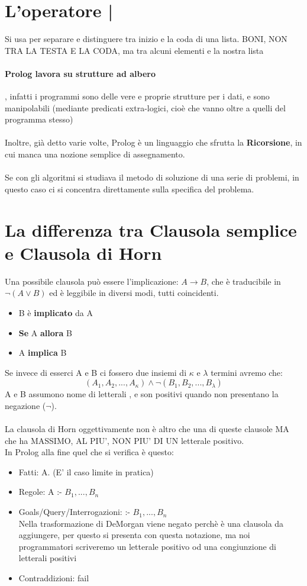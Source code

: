 \documentclass[12pt, a4paper, openany, oneside]{book}
\begin{document}
\section{L'operatore | }
Si usa per separare e distinguere tra inizio e la coda di una lista. BONI, NON 
TRA LA TESTA E LA CODA, ma tra alcuni elementi e la nostra lista
\paragraph{Prolog lavora su strutture ad albero }, infatti i programmi sono delle
vere e proprie strutture per i dati, e sono manipolabili (mediante predicati
extra-logici, cioè che vanno oltre a quelli del programma stesso)
\\ \\
Inoltre, già detto varie volte, Prolog è un linguaggio che sfrutta la 
\textbf{Ricorsione}, in cui manca una nozione semplice di assegnamento.
\\ \\
Se con gli algoritmi si studiava il metodo di soluzione di una serie di problemi,
in questo caso ci si concentra direttamente sulla specifica del problema.
\section{La differenza tra Clausola semplice e Clausola di \color{red} Horn
\color{black}}
Una possibile clausola può essere l'implicazione: $A \to B$, che è traducibile
in $\neg(A \vee B)$ ed è leggibile in diversi modi, tutti coincidenti.
\begin{itemize}
	\item B è \textbf{implicato} da A
	\item \textbf{Se} A \textbf{allora} B
	\item A \textbf{implica} B
\end{itemize}
Se invece di esserci A e B ci fossero due insiemi di $\kappa$ e $\lambda$ 
termini avremo che:
\[
(A_{1}, A_{2}, ... ,A_{\kappa}) \wedge \neg(B_{1}, B_{2}, ... ,B_{\lambda})
\]
A e B assumono nome di \color{red} letterali \color{black}, e son positivi 
quando non presentano la negazione ($\neg$).
\\ \\
La clausola di Horn oggettivamente non è altro che una di queste clausole MA 
che ha MASSIMO, AL PIU', NON PIU' DI UN letterale positivo.
\\ 
In Prolog alla fine quel che si verifica è questo:
\begin{itemize}
	\item \color{red} Fatti:  \color{black} A. (E' il caso limite in pratica)
	\item \color{red} Regole: \color{black} A :- $B_{1}, ..., B_{n}$
	\item \color{red} Goals/Query/Interrogazioni:  \color{black} :- $B_{1}, ..., B_{n}$ \\
	Nella trasformazione di DeMorgan viene negato perchè è una clausola da 
	aggiungere, per questo si presenta con questa notazione, ma noi
	programmatori scriveremo un letterale positivo od una congiunzione di 
	letterali positivi
	\item \color{red} Contraddizioni: \color{black} fail
\end{itemize}
\end{document}
